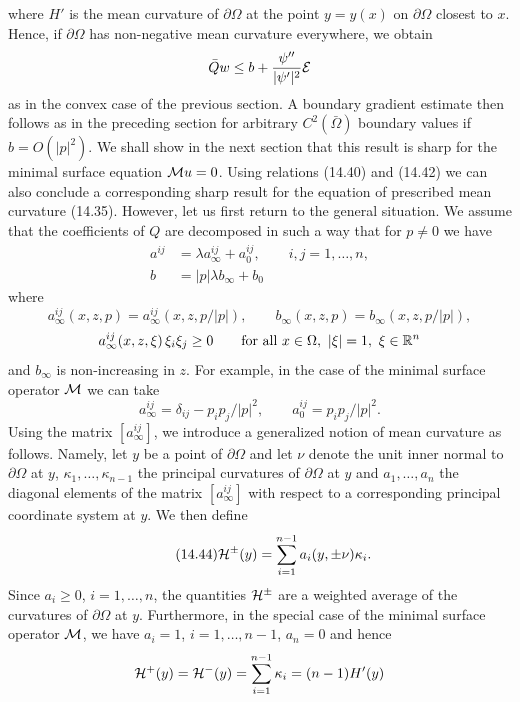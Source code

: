 where $H'$ is the mean curvature of $\partial\Omega$ at the point $y=y(x)$ on $\partial\Omega$ closest to $x$.
Hence, if $\partial\Omega$ has non-negative mean curvature everywhere, we obtain
\[
\bar{Q} w\le b+\frac{\psi''}{|\psi'|^2}\mathcal{E}
\]
as in the convex case of the previous section. A boundary gradient estimate
then follows as in the preceding section for arbitrary $C^2(\bar\Omega)$ boundary values if
$b=O(|p|^2)$. We shall show in the next section that this result is sharp for the
minimal surface equation $\mathcal{M} u=0$. Using relations (14.40) and (14.42) we can also
conclude a corresponding sharp result for the equation of prescribed mean
curvature (14.35). However, let us first return to the general situation. We assume
that the coefficients of $Q$ are decomposed in such a way that for $p\neq 0$ we have
\begin{equation}
\tag{14.43}
\begin{aligned}
 a^{ij} &= \lambda a^{ij}_{\infty}+a^{ij}_0, \qquad i,j=1,\ldots,n, \\
 b &= |p|\lambda b_{\infty}+b_0
\end{aligned}
\end{equation}
where
\[
 a^{ij}_{\infty}(x,z,p)=a^{ij}_{\infty}(x,z,p/|p|), \qquad b_{\infty}(x,z,p)=b_{\infty}(x,z,p/|p|),
\]
\[
 a^{ij}_{\infty}(x,z,\xi)\,\xi_i\xi_j\ge 0 \qquad \text{for all } x\in\Omega,\ |\xi|=1,\ \xi\in\mathbb{R}^n
\]
and $b_{\infty}$ is non-increasing in $z$. For example, in the case of the minimal surface
operator $\mathcal{M}$ we can take
\[
 a^{ij}_{\infty}=\delta_{ij}-p_i p_j/|p|^2, \qquad a^{ij}_0=p_i p_j/|p|^2.
\]
Using the matrix $[a^{ij}_{\infty}]$, we introduce a generalized notion of mean curvature as
follows. Namely, let $y$ be a point of $\partial\Omega$ and let $\nu$ denote the unit inner normal to
$\partial\Omega$ at $y$, $\kappa_1,\ldots,\kappa_{n-1}$ the principal curvatures of $\partial\Omega$ at $y$ and
$a_1,\ldots,a_n$ the diagonal elements of the matrix $[a^{ij}_{\infty}]$ with respect to a corresponding principal coordinate
system at $y$. We then define
\begin{equation}
\tag{14.44}
\mathcal{H}^{\pm}(y)=\sum_{i=1}^{n-1} a_i(y,\pm\nu)\kappa_i.
\end{equation}
Since $a_i\ge 0$, $i=1,\ldots,n$, the quantities $\mathcal{H}^{\pm}$ are a weighted average of the curvatures
of $\partial\Omega$ at $y$. Furthermore, in the special case of the minimal surface operator $\mathcal{M}$,
we have $a_i=1$, $i=1,\ldots,n-1$, $a_n=0$ and hence
\[
\mathcal{H}^+(y)=\mathcal{H}^-(y)=\sum_{i=1}^{n-1}\kappa_i=(n-1)H'(y)
\]


